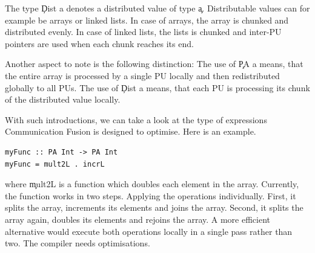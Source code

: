     The type \c{Dist a} denotes a distributed value of type \c{a}.
    Distributable values can for example be arrays or linked lists.
    In case of arrays, the array is chunked and distributed evenly.
    In case of linked lists, the lists is chunked and
    inter-PU pointers are used when each chunk reaches its end.
    
    Another aspect to note is the following distinction:
    The use of \c{PA a} means, that the entire array
    is processed by a single PU locally and
    then redistributed globally to all PUs.
    The use of \c{Dist a} means,
    that each PU is processing its
    chunk of the distributed value locally.
    
    With such introductions, we can take a look at the type of expressions
    Communication Fusion is designed to optimise. Here is an example.
    \begin{lstlisting}
myFunc :: PA Int -> PA Int
myFunc = mult2L . incrL
    \end{lstlisting}
    where \c{mult2L} is a function which doubles each element in the array.
    Currently, the function works in two steps. Applying the operations individually.
    First, it splits the array, increments its elements and joins the array. Second, it splits
    the array again, doubles its elements and rejoins the array.
    A more efficient alternative would execute both operations locally
    in a single pass rather than two. The compiler needs optimisations.
    

